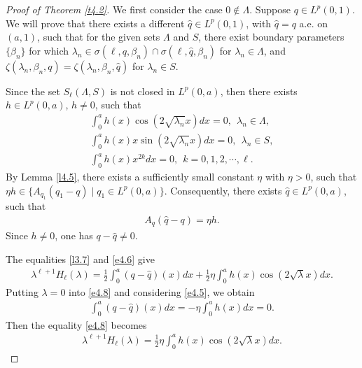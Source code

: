 \documentclass[reqno,12pt,centertags]{amsart}
\numberwithin{equation}{section}
\theoremstyle{definition}
\begin{document}
\begin{proof}[Proof of Theorem \ref{t4.2}]
We first consider the case $0 \notin \Lambda$. 
Suppose $q \in L^p(0,1)$. We will prove that there exists a different $\hat{q} \in L^p(0,1)$, with $\hat{q}=q$ a.e. on $(a, 1)$, such that for the given sets $\Lambda$ and $S$, there exist boundary parameters $\{\beta_n\}$ for which $\lambda_n \in \sigma(\ell, q, \beta_n) \cap \sigma(\ell, \hat{q}, \beta_n)$ for $\lambda_n \in \Lambda$, and $\zeta(\lambda_{n},\beta_{n}, q) = \zeta(\lambda_{n},\beta_{n}, \hat{q})$ for $\lambda_n \in S$.

Since the set $S_{\ell}(\Lambda, S)$ is not closed in $L^p(0, a)$, then there exists $h \in L^p(0, a)$, $h \neq 0$, such that
\begin{align}
\int_{0}^{a}h(x)\cos(2\sqrt{\lambda_n}x)dx=0, 
~~\lambda_n \in \Lambda, \label{e4.3}\\
\int_{0}^{a}h(x)x\sin(2\sqrt{\lambda_n}x)dx=0, 
~~\lambda_n \in S, \label{e4.4}\\
\int_{0}^{a}h(x)x^{2k}dx=0, 
~~k=0,1,2, \cdots, \ell. \label{e4.5}
\end{align}
By Lemma \ref{l4.5}, there exists a sufficiently small constant $\eta$ with $\eta>0$, such that $\eta h \in \{A_{q_1}(q_1-q)\mid q_1 \in L^p(0, a)\}$. Consequently, there exists $\hat{q} \in L^p(0, a)$, such that
\begin{align}\label{e4.6}
A_{\hat{q}}(\hat{q}-q)=\eta h.
\end{align}
Since $h\neq 0$, one has $q-\hat{q}\neq 0$.

The equalities \eqref{l3.7} and \eqref{e4.6} give 
\begin{align}\label{e4.8}
\lambda^{\ell+1} H_{\ell}(\lambda)
=\frac{1}{2}\int_{0}^{a}(q-\hat{q})(x)dx
+\frac{1}{2}\eta\int_{0}^{a}h(x)\cos(2\sqrt{\lambda}x)dx.
\end{align}
Putting $\lambda=0$ into \eqref{e4.8} and considering \eqref{e4.5}, we obtain 
\begin{align*}
\int_{0}^{a}(q-\hat{q})(x)dx=-\eta\int_{0}^{a}h(x)dx=0.
\end{align*}
 Then the equality \eqref{e4.8} becomes 
\begin{align}\label{e4.9}
\lambda^{\ell+1} H_{\ell}(\lambda)
=\frac{1}{2}\eta\int_{0}^{a}h(x)\cos(2\sqrt{\lambda}x)dx.
\end{align}


\end{proof}
\end{document}

